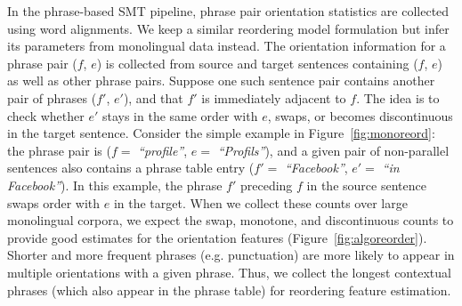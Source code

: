 \documentclass[11pt]{article}
\newcommand{\mtodo}[1]{}
\newcommand{\figref}[1]{Figure~\ref{#1}}
\newcommand{\emq}[1]{\emph{``#1''}}
\begin{document}
In the phrase-based SMT pipeline, phrase pair orientation statistics are collected using word alignments.  We keep a similar reordering model formulation but infer its parameters from monolingual data instead.  The orientation information for a phrase pair ($f$, $e$) is collected from source and target sentences containing ($f$, $e$) as well as other phrase pairs.  Suppose one such sentence pair contains another pair of phrases ($f'$, $e'$), and that $f'$ is immediately adjacent to $f$.  The idea is to check whether $e'$ stays in the same order with $e$, swaps, or becomes discontinuous in the target sentence. Consider the simple example in \figref{fig:monoreord}: the phrase pair is ($f =$ \emq{profile}, $e =$ \emq{Profils}), and a given pair of non-parallel sentences also contains a phrase table entry ($f' =$ \emq{Facebook}, $e' =$ \emq{in Facebook}).  In this example, the phrase $f'$ preceding $f$ in the source sentence swaps order with $e$ in the target.  When we collect these counts over large monolingual corpora, we expect the swap, monotone, and discontinuous counts to provide good estimates for the orientation features (\figref{fig:algoreorder}).
Shorter and more frequent phrases (e.g. punctuation) are more likely to appear in multiple orientations with a given phrase.  Thus, we collect the longest contextual phrases (which also appear in the phrase table) for reordering feature estimation.

\end{document}
